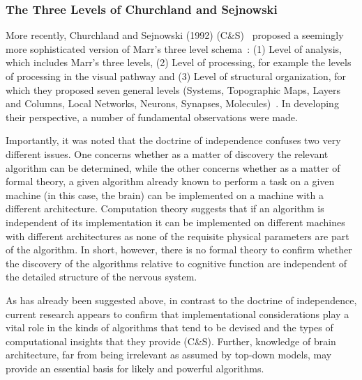 \documentclass[10pt,letterpaper]{article}
\begin{document}


\subsubsection*{The Three Levels of Churchland and Sejnowski}

More recently, Churchland and Sejnowski (1992) (C\&S)~\cite{Churchland:1992uq} proposed a seemingly more sophisticated version of Marr's three level schema~\cite{Marr:1982fk}: (1) Level of analysis, which includes Marr’s three levels, (2) Level of processing, for example the levels of processing in the visual pathway and (3) Level of structural organization, for which they proposed seven general levels (Systems, Topographic Maps, Layers and Columns, Local Networks, Neurons, Synapses, Molecules)~\cite{Churchland:1992uq}.  In developing their perspective, a number of fundamental observations were made.

Importantly, it was noted that the doctrine of independence confuses two very different issues. One concerns whether as a matter of discovery the relevant algorithm can be determined, while the other concerns whether as a matter of formal theory, a given algorithm already known to perform a task on a given machine (in this case, the brain) can be implemented on a machine with a different architecture. Computation theory suggests that if an algorithm is independent of its implementation it can be implemented on different machines with different architectures as none of the requisite physical parameters are part of the algorithm. In short, however, there is no formal theory to confirm whether the discovery of the algorithms relative to cognitive function are independent of the detailed structure of the nervous system.

As has already been suggested above, in contrast to the doctrine of independence, current research appears to confirm that implementational considerations play a vital role in the kinds of algorithms that tend to be devised and the types of computational insights that they provide (C\&S). Further, knowledge of brain architecture, far from being irrelevant as assumed by top-down models, may provide an essential basis for likely and powerful algorithms.
\end{document}
